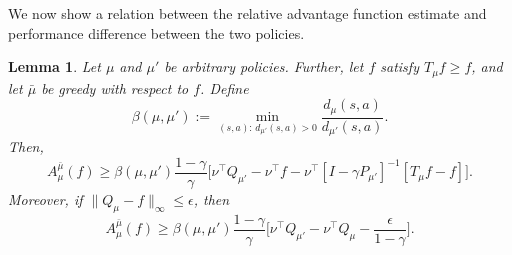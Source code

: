 \documentclass[twoside]{article}
\theoremstyle{plain}
\newtheorem{lemma}[theorem]{Lemma}
\theoremstyle{definition}
\theoremstyle{remark}
\begin{document}
We now show a relation between the relative advantage function estimate and performance difference between the two policies.

\begin{lemma}\label{lem:A.4}
Let $\mu$ and $\mu'$ be arbitrary policies. Further, let $f$ satisfy $T_\mu f \ge f$, and let $\bar\mu$ be greedy with respect to $f$. Define 
%
\begin{equation}
    \label{e:beta.defn}
    \beta(\mu,\mu') := \min_{(s,a):\, d_{\mu'}(s,a)>0} \frac{d_\mu(s,a)}{d_{\mu'}(s,a)}.
\end{equation}
%
Then,
%
\begin{equation}
    \label{e:A.mu.mub.Bd}
    A_\mu^{\bar\mu}(f) \ge \beta(\mu,\mu') \frac{1-\gamma}{\gamma} \Big[\nu^\top Q_{\mu'} - \nu^\top f - \nu^\top [I-\gamma P_{\mu'}]^{-1}[T_\mu f-f] \Big].
\end{equation}
%
Moreover, if $\|Q_\mu-f\|_\infty \le \epsilon$, then
%
\begin{equation}
    \label{e:A.mu.mub.eps.Bd}
    A_\mu^{\bar\mu}(f) \ge \beta(\mu,\mu') \frac{1-\gamma}{\gamma} \Big[\nu^\top Q_{\mu'} - \nu^\top Q_\mu - \frac{\epsilon}{1-\gamma}\Big].
\end{equation}
\end{lemma}
%
\end{document}
